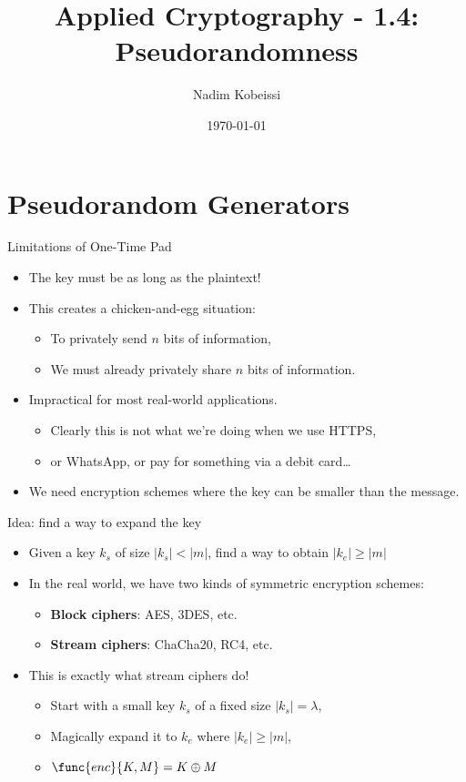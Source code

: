 \documentclass[aspectratio=169, lualatex, handout]{beamer}
\title{Applied Cryptography - 1.4: Pseudorandomness}
\author{Nadim Kobeissi}
\institute{American University of Beirut}
\date{\today}
\begin{document}
\begin{frame}[plain]
	\titlepage
\end{frame}

\section{Pseudorandom Generators}

\begin{frame}{Limitations of One-Time Pad}
	\begin{itemize}[<+->]
		\item The key must be as long as the plaintext!
		\item This creates a chicken-and-egg situation:
		      \begin{itemize}[<+->]
			      \item To privately send $n$ bits of information,
			      \item We must already privately share $n$ bits of information.
		      \end{itemize}
		\item Impractical for most real-world applications.
		      \begin{itemize}[<+->]
			      \item Clearly this is not what we're doing when we use HTTPS,
			      \item or WhatsApp, or pay for something via a debit card\ldots
		      \end{itemize}
		\item We need encryption schemes where the key can be smaller than the message.
	\end{itemize}
\end{frame}

\begin{frame}{Idea: find a way to expand the key}
	\begin{itemize}[<+->]
		\item Given a key $k_s$ of size $\left|k_s\right| < \left|m\right|$, find a way to obtain $\left|k_e\right| \geq \left|m\right|$
		\item In the real world, we have two kinds of symmetric encryption schemes:
		      \begin{itemize}[<+->]
			      \item \textbf{Block ciphers}: AES, 3DES, etc.
			      \item \textbf{Stream ciphers}: ChaCha20, RC4, etc.
		      \end{itemize}
		\item This is exactly what stream ciphers do!
		      \begin{itemize}[<+->]
			      \item Start with a small key $k_s$ of a fixed size $\left|k_s\right| = \lambda$,
			      \item Magically expand it to $k_e$ where $\left|k_e\right| \geq \left|m\right|$,
			      \item $\func{enc}{K, M} = K \oplus M$
		      \end{itemize}
	\end{itemize}
\end{frame}
\end{document}
